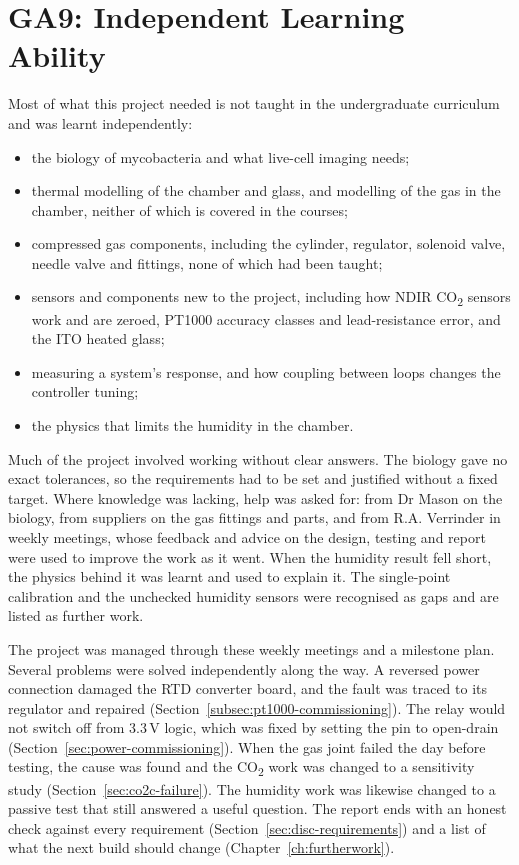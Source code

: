 \section{GA9: Independent Learning Ability}
\label{app:ga9}

Most of what this project needed is not taught in the undergraduate curriculum and was learnt independently:

\begin{itemize}[nosep]
    \item the biology of mycobacteria and what live-cell imaging needs;
    \item thermal modelling of the chamber and glass, and modelling of the gas in the chamber, neither of which is covered in the courses;
    \item compressed gas components, including the cylinder, regulator, solenoid valve, needle valve and fittings, none of which had been taught;
    \item sensors and components new to the project, including how NDIR CO\textsubscript{2} sensors work and are zeroed, PT1000 accuracy classes and lead-resistance error, and the ITO heated glass;
    \item measuring a system's response, and how coupling between loops changes the controller tuning;
    \item the physics that limits the humidity in the chamber.
\end{itemize}

Much of the project involved working without clear answers. The biology gave no exact tolerances, so the requirements had to be set and justified without a fixed target. Where knowledge was lacking, help was asked for: from Dr Mason on the biology, from suppliers on the gas fittings and parts, and from R.A. Verrinder in weekly meetings, whose feedback and advice on the design, testing and report were used to improve the work as it went. When the humidity result fell short, the physics behind it was learnt and used to explain it. The single-point calibration and the unchecked humidity sensors were recognised as gaps and are listed as further work.

The project was managed through these weekly meetings and a milestone plan. Several problems were solved independently along the way. A reversed power connection damaged the RTD converter board, and the fault was traced to its regulator and repaired (Section~\ref{subsec:pt1000-commissioning}). The relay would not switch off from 3.3\,V logic, which was fixed by setting the pin to open-drain (Section~\ref{sec:power-commissioning}). When the gas joint failed the day before testing, the cause was found and the CO\textsubscript{2} work was changed to a sensitivity study (Section~\ref{sec:co2c-failure}). The humidity work was likewise changed to a passive test that still answered a useful question. The report ends with an honest check against every requirement (Section~\ref{sec:disc-requirements}) and a list of what the next build should change (Chapter~\ref{ch:furtherwork}).
